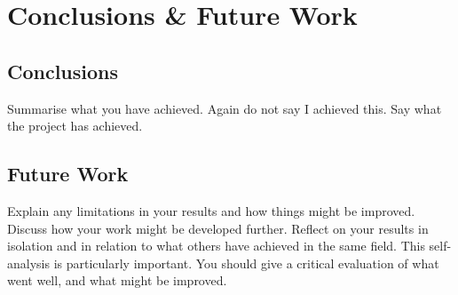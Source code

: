 \chapter{Conclusions \& Future Work}

\section{Conclusions}
Summarise what you have achieved. Again do not say I achieved this. Say what 
the project has achieved. 

\section{Future Work}
Explain any limitations in your results and how things might be improved. 
Discuss how your work might be developed further.  Reflect on your results in 
isolation and in relation to what others have achieved in the same field. This 
self-analysis is particularly important.  You should give a critical evaluation 
of what went well, and what might be improved.
